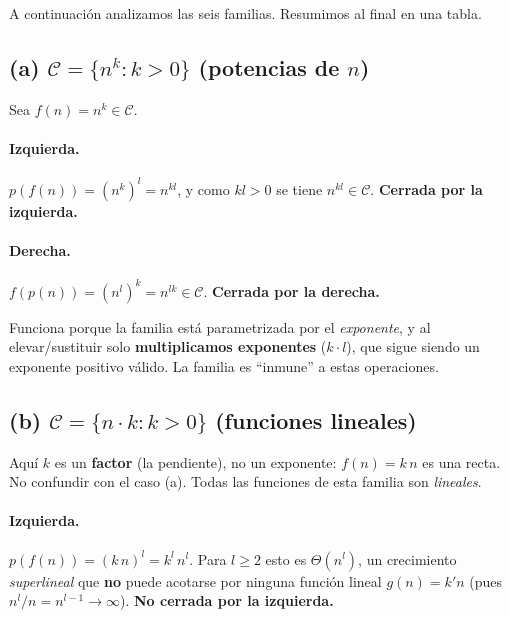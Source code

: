 \documentclass[11pt,a4paper]{article}
\theoremstyle{plain}
\theoremstyle{definition}
\begin{document}
A continuaci\'on analizamos las seis familias. Resumimos al final en una tabla.

\subsection*{(a) $\mathcal{C}=\{n^{k}: k>0\}$ (potencias de $n$)}

Sea $f(n)=n^{k}\in\mathcal{C}$.
\paragraph{Izquierda.} $p(f(n)) = (n^{k})^{l} = n^{kl}$, y como $kl>0$ se tiene
$n^{kl}\in\mathcal{C}$. \textbf{Cerrada por la izquierda.}
\paragraph{Derecha.} $f(p(n)) = (n^{l})^{k} = n^{lk}\in\mathcal{C}$.
\textbf{Cerrada por la derecha.}
\medskip\noindent{}

\begin{porque}
Funciona porque la familia est\'a parametrizada por el \emph{exponente}, y al
elevar/sustituir solo \textbf{multiplicamos exponentes} ($k\cdot l$), que sigue siendo
un exponente positivo v\'alido. La familia es ``inmune'' a estas operaciones.
\end{porque}

\subsection*{(b) $\mathcal{C}=\{n\cdot k: k>0\}$ (funciones lineales)}

\begin{cuidado}
Aqu\'i $k$ es un \textbf{factor} (la pendiente), no un exponente: $f(n)=k\,n$ es una
recta. No confundir con el caso (a). Todas las funciones de esta familia son
\emph{lineales}.
\end{cuidado}

\paragraph{Izquierda.} $p(f(n)) = (k\,n)^{l} = k^{l}\,n^{l}$. Para $l\geq 2$ esto es
$\Theta(n^{l})$, un crecimiento \emph{superlineal} que \textbf{no} puede acotarse por
ninguna funci\'on lineal $g(n)=k'n$ (pues $n^{l}/n=n^{l-1}\to\infty$). \textbf{No
cerrada por la izquierda.}
\end{document}
